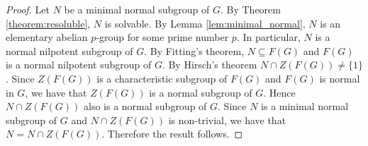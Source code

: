 \begin{proof}
	Let $N$ be a minimal normal subgroup of $G$. By Theorem \ref{theorem:resoluble}, $N$ is solvable. 
	By Lemma \ref{lem:minimal_normal}, $N$ is an elementary abelian $p$-group for some prime number $p$.
	In particular, $N$ is a normal nilpotent subgroup of $G$. By Fitting's theorem, $N\subseteq F(G)$ and $F(G)$ is a normal nilpotent subgroup of $G$. By Hirsch's theorem $N\cap Z(F(G))\neq\{ 1\}$. Since $Z(F(G))$ is a characteristic subgroup of $F(G)$ and $F(G)$ is normal in $G$, we have that $Z(F(G))$ is a normal subgroup of $G$.
	Hence $N\cap Z(F(G))$ also is a normal subgroup of $G$.
	Since $N$ is a minimal normal subgroup of $G$ and $N\cap Z(F(G))$ is non-trivial, we have that $N=N\cap Z(F(G))$.
	Therefore the result follows.
\end{proof}







%

